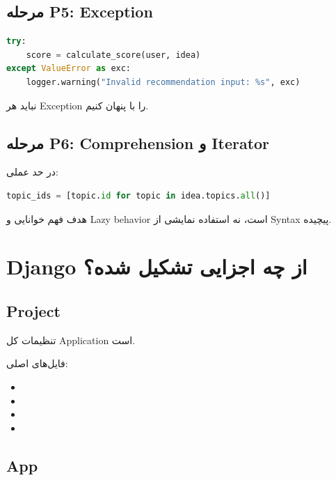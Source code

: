 \subsection{مرحله P5: Exception}

\begin{latin}
\begin{lstlisting}[language=Python]
try:
    score = calculate_score(user, idea)
except ValueError as exc:
    logger.warning("Invalid recommendation input: %s", exc)
\end{lstlisting}
\end{latin}

نباید هر Exception را با  پنهان کنیم.

\subsection{مرحله P6: Comprehension و Iterator}

در حد عملی:
\begin{latin}
\begin{lstlisting}[language=Python]
topic_ids = [topic.id for topic in idea.topics.all()]
\end{lstlisting}
\end{latin}

هدف فهم خوانایی و Lazy behavior است، نه استفاده نمایشی از Syntax پیچیده.

\section{Django از چه اجزایی تشکیل شده؟}

\subsection{Project}

 تنظیمات کل Application است.

فایل‌های اصلی:
\begin{itemize}
  \item {}
  \item {}
  \item {}
  \item {}
\end{itemize}

\subsection{App}

